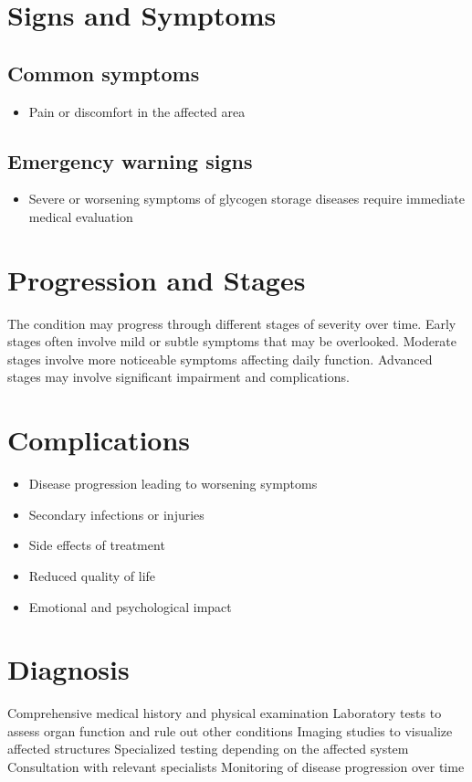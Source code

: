 \section{Signs and Symptoms}

\subsection{Common symptoms}
\begin{itemize}[noitemsep]
  \item Pain or discomfort in the affected area
  \end{itemize}

\subsection{Emergency warning signs}
\begin{itemize}[noitemsep]
  \item Severe or worsening symptoms of glycogen storage diseases require immediate medical evaluation
\end{itemize}
\section{Progression and Stages}
The condition may progress through different stages of severity over time. Early stages often involve mild or subtle symptoms that may be overlooked. Moderate stages involve more noticeable symptoms affecting daily function. Advanced stages may involve significant impairment and complications.
\section{Complications}
\begin{itemize}[noitemsep]
  \item Disease progression leading to worsening symptoms
  \item Secondary infections or injuries
  \item Side effects of treatment
  \item Reduced quality of life
  \item Emotional and psychological impact
\end{itemize}
\section{Diagnosis}
Comprehensive medical history and physical examination Laboratory tests to assess organ function and rule out other conditions Imaging studies to visualize affected structures Specialized testing depending on the affected system Consultation with relevant specialists Monitoring of disease progression over time

